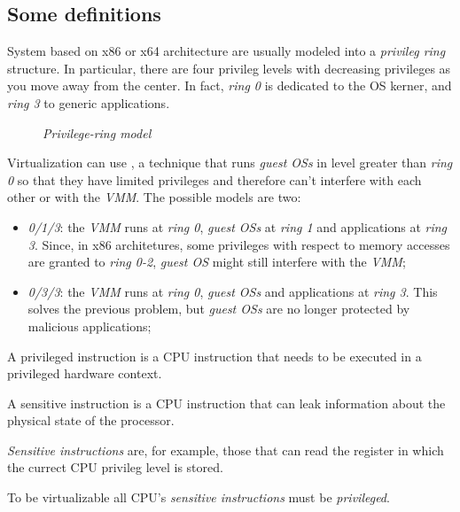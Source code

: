 \subsection{Some definitions}
System based on x86 or x64 architecture are usually modeled into a \emph{privileg
ring} structure. In particular, there are four privileg levels with decreasing
privileges as you move away from the center. In fact, \emph{ring 0} is dedicated
to the OS kerner, and \emph{ring 3} to generic applications.

\begin{figure}[h!]
    \centering
    \caption{\emph{Privilege-ring model}}
\end{figure}

\noindent
Virtualization can use , a technique that runs
\emph{guest OSs} in level greater than \emph{ring 0} so that they have
limited privileges and therefore can't interfere with each other or with the
\emph{VMM}. The possible models are two:
\begin{itemize}
    \item\emph{0/1/3}: the \emph{VMM} runs at \emph{ring 0}, \emph{guest OSs}
    at \emph{ring 1} and applications at \emph{ring 3}. Since, in x86 architetures,
    some privileges with respect to memory accesses are granted to \emph{ring 0-2},
    \emph{guest OS} might still interfere with the \emph{VMM};
    \item\emph{0/3/3}: the \emph{VMM} runs at \emph{ring 0}, \emph{guest OSs}
    and applications at \emph{ring 3}. This solves the previous problem, but
    \emph{guest OSs} are no longer protected by malicious applications;
\end{itemize}

\begin{definition}
    A privileged instruction is a CPU instruction that needs to be executed in
    a privileged hardware context.
\end{definition}
\begin{definition}
    A sensitive instruction is a CPU instruction that can leak information about
    the physical state of the processor.
\end{definition}
\begin{note}
    \emph{Sensitive instructions} are, for example, those that can read the
    register in which the currect CPU privileg level is stored.
\end{note}\noindent
To be virtualizable all CPU's \emph{sensitive instructions} must be
\emph{privileged}.

